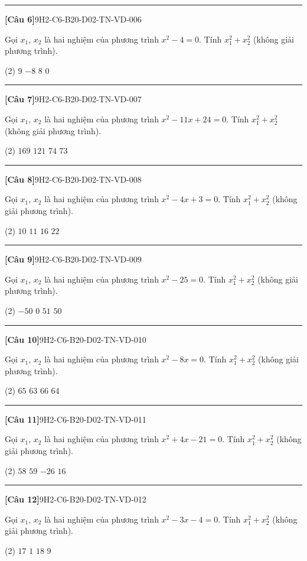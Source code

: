 \documentclass[12pt,a4paper]{article}
\newif\ifloigiai
\newenvironment{cauhoi}[2]{%
  \par\medskip\noindent\rule{\textwidth}{0.4pt}\par\nopagebreak
  \noindent\textbf{[#1]}\hfill{\scriptsize\ttfamily #2}\par\nopagebreak\smallskip}{\par}
\newcommand{\dapan}[1]{\ifloigiai\par\smallskip\noindent\textit{Đáp án:} \textbf{#1}\par\fi}
\begin{document}
\begin{cauhoi}{Câu 6}{9H2-C6-B20-D02-TN-VD-006}
Gọi $x_1$, $x_2$ là hai nghiệm của phương trình $x^{2}-4=0$. Tính $x_1^{2}+x_2^{2}$ (không giải phương trình).
\begin{tasks}(2)
\task $9$
\task $-8$
\task $8$
\task $0$
\end{tasks}
\dapan{C}
\end{cauhoi}
\begin{cauhoi}{Câu 7}{9H2-C6-B20-D02-TN-VD-007}
Gọi $x_1$, $x_2$ là hai nghiệm của phương trình $x^{2}-11x+24=0$. Tính $x_1^{2}+x_2^{2}$ (không giải phương trình).
\begin{tasks}(2)
\task $169$
\task $121$
\task $74$
\task $73$
\end{tasks}
\dapan{D}
\end{cauhoi}
\begin{cauhoi}{Câu 8}{9H2-C6-B20-D02-TN-VD-008}
Gọi $x_1$, $x_2$ là hai nghiệm của phương trình $x^{2}-4x+3=0$. Tính $x_1^{2}+x_2^{2}$ (không giải phương trình).
\begin{tasks}(2)
\task $10$
\task $11$
\task $16$
\task $22$
\end{tasks}
\dapan{A}
\end{cauhoi}
\begin{cauhoi}{Câu 9}{9H2-C6-B20-D02-TN-VD-009}
Gọi $x_1$, $x_2$ là hai nghiệm của phương trình $x^{2}-25=0$. Tính $x_1^{2}+x_2^{2}$ (không giải phương trình).
\begin{tasks}(2)
\task $-50$
\task $0$
\task $51$
\task $50$
\end{tasks}
\dapan{D}
\end{cauhoi}
\begin{cauhoi}{Câu 10}{9H2-C6-B20-D02-TN-VD-010}
Gọi $x_1$, $x_2$ là hai nghiệm của phương trình $x^{2}-8x=0$. Tính $x_1^{2}+x_2^{2}$ (không giải phương trình).
\begin{tasks}(2)
\task $65$
\task $63$
\task $66$
\task $64$
\end{tasks}
\dapan{D}
\end{cauhoi}
\begin{cauhoi}{Câu 11}{9H2-C6-B20-D02-TN-VD-011}
Gọi $x_1$, $x_2$ là hai nghiệm của phương trình $x^{2}+4x-21=0$. Tính $x_1^{2}+x_2^{2}$ (không giải phương trình).
\begin{tasks}(2)
\task $58$
\task $59$
\task $-26$
\task $16$
\end{tasks}
\dapan{A}
\end{cauhoi}
\begin{cauhoi}{Câu 12}{9H2-C6-B20-D02-TN-VD-012}
Gọi $x_1$, $x_2$ là hai nghiệm của phương trình $x^{2}-3x-4=0$. Tính $x_1^{2}+x_2^{2}$ (không giải phương trình).
\begin{tasks}(2)
\task $17$
\task $1$
\task $18$
\task $9$
\end{tasks}
\dapan{A}
\end{cauhoi}
\end{document}
